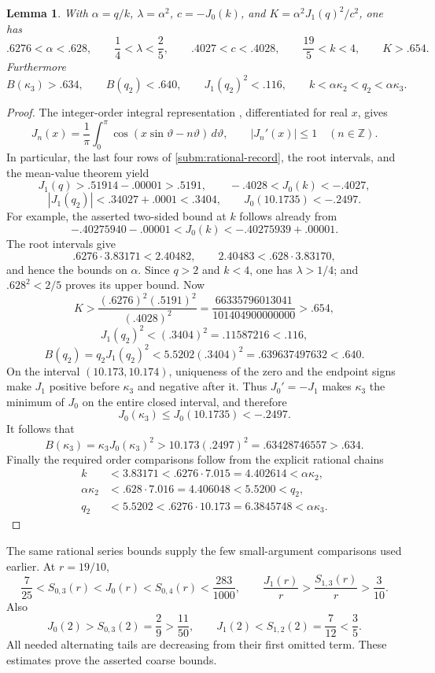 \documentclass[11pt,letterpaper,reqno]{amsart}
\newtheorem{lemma}[theorem]{Lemma}
\theoremstyle{definition}
\begin{document}
\begin{lemma}\label{gm:coarse}
With $\alpha=q/k$, $\lambda=\alpha^2$, $c=-J_0(k)$, and
$K=\alpha^2J_1(q)^2/c^2$, one has
\[
 .6276<\alpha<.628,\qquad \frac14<\lambda<\frac25,
 \qquad .4027<c<.4028,\qquad \frac{19}5<k<4,
 \qquad K>.654.
\]
Furthermore
\[
 B(\kappa_3)>.634,\qquad B(q_2)<.640,\qquad
 J_1(q_2)^2<.116,
 \qquad k<\alpha\kappa_2<q_2<\alpha\kappa_3.
\]
\end{lemma}
\begin{proof}
The integer-order integral representation
\cite[Eq.~10.9.2]{DLMF}, differentiated for real $x$, gives
\[
 J_n(x)=\frac1\pi\int_0^\pi
       \cos(x\sin\vartheta-n\vartheta)\,d\vartheta,
 \qquad |J_n'(x)|\le1\quad(n\in\mathbb Z).
\]
In particular, the last four rows of
\eqref{subm:rational-record}, the root intervals, and the mean-value
theorem yield
\[
 J_1(q)>.51914-.00001>.5191,\qquad
 -.4028<J_0(k)<-.4027,
\]
\[
 |J_1(q_2)|<.34027+.0001<.3404,\qquad
 J_0(10.1735)<-.2497.
\]
For example, the asserted two-sided bound at $k$ follows already from
\[
 -.40275940-.00001<J_0(k)
                  <-.40275939+.00001.
\]
The root intervals give
\[
 .6276\cdot3.83171<2.40482,
 \qquad 2.40483<.628\cdot3.83170,
\]
and hence the bounds on $\alpha$.  Since $q>2$ and $k<4$, one has
$\lambda>1/4$; and $.628^2<2/5$ proves its upper bound.  Now
\[
 K>\frac{(.6276)^2(.5191)^2}{(.4028)^2}
 =\frac{66335796013041}{101404900000000}>.654,
\]
\[
 J_1(q_2)^2<(.3404)^2=.11587216<.116,
\]
\[
 B(q_2)=q_2J_1(q_2)^2
 <5.5202(.3404)^2=.639637497632<.640.
\]
On the interval $(10.173,10.174)$, uniqueness of the zero and the
endpoint signs make $J_1$ positive before $\kappa_3$ and negative
after it.  Thus $J_0'=-J_1$ makes $\kappa_3$ the minimum of $J_0$
on the entire closed interval, and therefore
\[
 J_0(\kappa_3)\le J_0(10.1735)<-.2497.
\]
It follows that
\[
 B(\kappa_3)=\kappa_3J_0(\kappa_3)^2
 >10.173(.2497)^2=.63428746557>.634.
\]
Finally the required order comparisons follow from the explicit
rational chains
\[
\begin{aligned}
 k&<3.83171<.6276\cdot7.015=4.402614<\alpha\kappa_2,\\
 \alpha\kappa_2&<.628\cdot7.016=4.406048<5.5200<q_2,\\
 q_2&<5.5202<.6276\cdot10.173=6.3845748<\alpha\kappa_3.
\end{aligned}
\]
\end{proof}

The same rational series bounds supply the few small-argument
comparisons used earlier.  At $r=19/10$,
\[
 \frac7{25}<S_{0,3}(r)<J_0(r)<S_{0,4}(r)
 <\frac{283}{1000},\qquad
 \frac{J_1(r)}r>\frac{S_{1,3}(r)}r>\frac3{10}.
\]
Also
\[
 J_0(2)>S_{0,3}(2)=\frac29>\frac{11}{50},\qquad
 J_1(2)<S_{1,2}(2)=\frac7{12}<\frac35.
\]
All needed alternating tails are decreasing from their first omitted
term.  These estimates prove the asserted coarse bounds.
\end{document}
